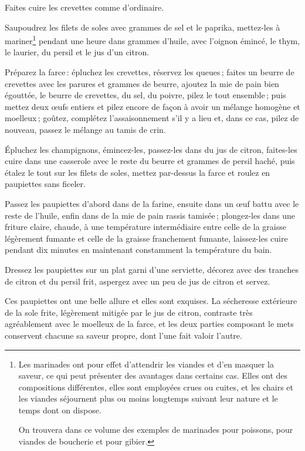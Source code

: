 Faites cuire les crevettes comme d'ordinaire.

Saupoudrez les filets de soles avec {\mmm} grammes de sel et le paprika, mettez-les
à mariner\footnote{
Les marinades ont pour effet d’attendrir les viandes et d'en
masquer la saveur, ce qui peut présenter des avantages dans certains cas. Elles
ont des compositions différentes, elles sont employées crues ou cuites, et les
chairs et les viandes séjournent plus ou moins longtemps suivant leur nature et
le temps dont on dispose.

On trouvera dans ce volume des exemples de marinades pour poissons, pour
viandes de boucherie et pour gibier.} pendant une heure dans {\mmm} grammes
d'huile, avec l'oignon émincé, le thym, le laurier, du persil et le jus d'un
citron.

Préparez la farce : épluchez les crevettes, réservez les queues ; faites un
beurre de crevettes avec les parures et {\mmm} grammes de beurre, ajoutez la mie de
pain bien égouttée, le beurre de crevettes, du sel, du poivre, pilez le tout
ensemble ; puis mettez deux œufs entiers et pilez encore de façon à avoir un
mélange homogène et moelleux ; goûtez, complétez l'assaisonnement s'il y a lieu
et, dans ce cas, pilez de nouveau, passez le mélange au tamis de crin.

Épluchez les champignons, émincez-les, passez-les dans du jus de citron,
faites-les cuire dans une casserole avec le reste du beurre et {\mmm} grammes de
persil haché, puis étalez le tout sur les filets de soles, mettez par-dessus la
farce et roulez en paupiettes sans ficeler.

Passez les paupiettes d'abord dans de la farine, ensuite dans un œuf battu avec
le reste de l'huile, enfin dans de la mie de pain rassis tamisée ; plongez-les
dans une friture claire, chaude, à une température intermédiaire entre celle de
la graisse légèrement fumante et celle de la graisse franchement fumante,
laissez-les cuire pendant dix minutes en maintenant constamment la température
du bain.

Dressez les paupiettes sur un plat garni d'une serviette, décorez avec des
tranches de citron et du persil frit, aspergez avec un peu de jus de citron et
servez.

Ces paupiettes ont une belle allure et elles sont exquises. La sécheresse
extérieure de la sole frite, légèrement mitigée par le jus de citron, contraste
très agréablement avec le moelleux de la farce, et les deux parties composant
le mets conservent chacune sa saveur propre, dont l'une fait valoir l'autre.


